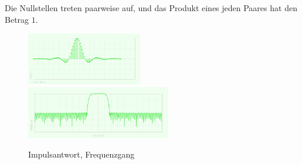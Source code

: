 Die Nullstellen treten paarweise auf, 
und das Produkt eines jeden Paares
hat den Betrag $1$.

\begin{figure}[H]
\centering
\includegraphics[height=23mm]{images/Figure_cfnbir.png}
\hspace{10mm}
\includegraphics[height=23mm]{images/Figure_cfnbPolished.png}
\caption{Impulsantwort, Frequenzgang}
\end{figure}

%
%
